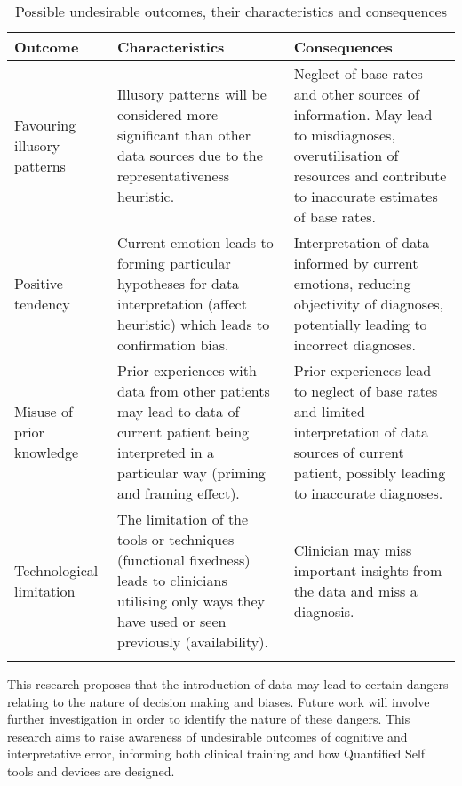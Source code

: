 \documentclass{chi-ext}
\begin{document}
\begin{table*}[t]
    \caption{Possible undesirable outcomes, their characteristics and consequences}
    \centering

    \begin{tabular}{lL{6.65cm}L{6.65cm}}\\
      \toprule
      \textbf{Outcome} & \textbf{Characteristics} & \textbf{Consequences} \\
      \midrule \addlinespace[0.4em]
      Favouring illusory patterns 
        & Illusory patterns will be considered more significant than other data sources due to the representativeness heuristic.
        & Neglect of base rates and other sources of information. May lead to misdiagnoses, overutilisation of resources and contribute to inaccurate estimates of base rates. \\ \addlinespace[0.6em]
      Positive tendency
        & Current emotion leads to forming particular hypotheses for data interpretation (affect heuristic) which leads to confirmation bias.
        & Interpretation of data informed by current emotions, reducing objectivity of diagnoses, potentially leading to incorrect diagnoses. \\ \addlinespace[0.6em]
      Misuse of prior knowledge
        & Prior experiences with data from other patients may lead to data of current patient being interpreted in a particular way (priming and framing effect).
        & Prior experiences lead to neglect of base rates and limited interpretation of data sources of current patient, possibly leading to inaccurate diagnoses. \\ \addlinespace[0.6em]
      Technological limitation
        & The limitation of the tools or techniques (functional fixedness) leads to clinicians utilising only ways they have used or seen previously (availability).
        & Clinician may miss important insights from the data and miss a diagnosis. \\ \addlinespace[0.4em]
      \bottomrule
    \end{tabular}
    
    \label{tab:dangers}
  \end{table*}


  This research proposes that the introduction of data may lead to certain dangers relating to the nature of decision making and biases. Future work will involve further investigation in order to identify the nature of these dangers. This research aims to raise awareness of undesirable outcomes of cognitive and interpretative error, informing both clinical training and how Quantified Self tools and devices are designed. 



\balance


\end{document}
